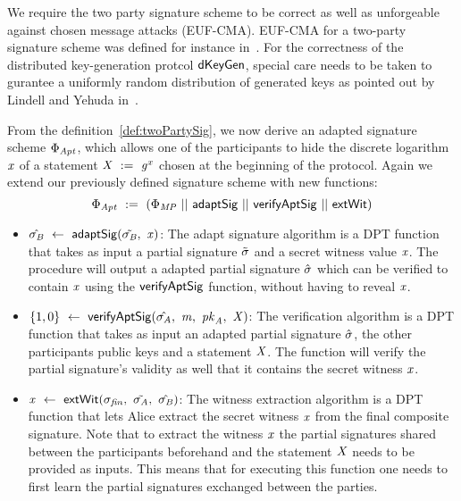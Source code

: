 We require the two party signature scheme to be correct as well as unforgeable against chosen message attacks (EUF-CMA). EUF-CMA for a two-party signature scheme was defined for instance in~\cite{lindell2017fast}.
For the correctness of the distributed key-generation protcol $\mathsf{dKeyGen}$, special care needs to be taken to gurantee a uniformly random distribution of generated keys as
pointed out by Lindell and Yehuda in~\cite{lindell2017fast}.

\begin{definition}
    \label{def:twoPartyFixedWitAptSig}
    From the definition~\ref{def:twoPartySig}, we now derive an adapted signature scheme $\Phi_{\mathit{Apt}}$, which allows one of the participants to hide the discrete logarithm $\mathit{x}$ of a statement $\mathit{X} ~:=~ \mathit{g}^{\mathit{x}}$ chosen
    at the beginning of the protocol. Again we extend our previously defined signature scheme with new functions:
    \[ \Phi_{\mathit{Apt}} ~:=~ (\Phi_{\mathit{MP}} ~||~ \mathsf{adaptSig} ~||~ \mathsf{verifyAptSig} ~||~ \mathsf{extWit}) \]

    \begin{itemize}
        \item $\hat{\sigma_{\mathit{B}}} ~\leftarrow~ \mathsf{adaptSig}(\tilde{\sigma_{\mathit{B}}} ,~ \mathit{x})$: The adapt signature algorithm is a DPT function that takes as input a partial signature $\tilde{\sigma}$ and a secret witness value $\mathit{x}$.
        The procedure will output a adapted partial signature $\hat{\sigma}$ which can be verified to contain $\mathit{x}$ using the $\mathsf{verifyAptSig}$ function, without having to reveal $\mathit{x}$.
        \item $\{1,0\} ~\leftarrow~ \mathsf{verifyAptSig}(\hat{\sigma_{\mathit{A}}} ,~ \mathit{m} ,~ \mathit{pk}_{\mathit{A}} ,~ \mathit{X})$: The verification algorithm is a DPT function that takes as input an adapted partial signature $\hat{\sigma}$,
        the other participants public keys and a statement $\mathit{X}$. The function will verify the partial signature's validity as well that it contains the secret witness $\mathit{x}$.
        \item $\mathit{x} ~\leftarrow~ \mathsf{extWit}(\sigma_{\mathit{fin}} ,~ \tilde{\sigma_{\mathit{A}}} ,~ \hat{\sigma_{\mathit{B}}})$: The witness extraction algorithm is a DPT function that lets Alice extract the secret witness $\mathit{x}$ from the final composite
        signature. Note that to extract the witness $\mathit{x}$ the partial signatures shared between the participants beforehand and the statement $\mathit{X}$ needs to be provided as inputs. This means that for
        executing this function one needs to first learn the partial signatures exchanged between the parties.
    \end{itemize}
\end{definition}

